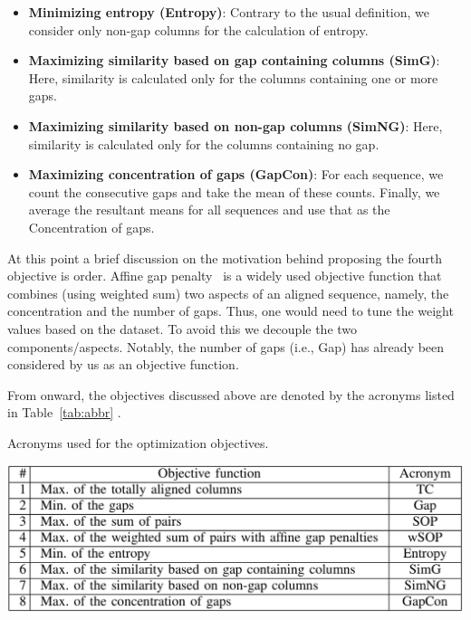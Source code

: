 \begin{itemize}
	\item \textbf{Minimizing entropy (Entropy)}: Contrary to the usual definition, we consider only non-gap columns for the calculation of entropy.
	
	\item \textbf{Maximizing similarity based on gap containing columns (SimG)}: Here, similarity is calculated only for the columns containing one or more gaps. 
	
	\item \textbf{Maximizing similarity based on non-gap columns (SimNG)}: Here, similarity is calculated only for the columns containing no gap.	
	\item \textbf{Maximizing concentration of gaps (GapCon)}: For each sequence, we count the consecutive gaps and take the mean of these counts. Finally, we average the resultant means for all sequences and use that as the Concentration of gaps.
	
\end{itemize}
At this point a brief discussion on the motivation behind proposing the fourth objective is order. Affine gap penalty~\citep{rani2016multiple} is a widely used objective function that combines (using weighted sum) two aspects of an aligned sequence, namely, the concentration and the number of gaps. Thus, one would need to tune the weight values based on the dataset. To avoid this we decouple the two components/aspects. Notably, the number of gaps (i.e., Gap) has already been considered by us as an objective function. 


From onward, the objectives discussed above are denoted by the acronyms listed in Table~\ref{tab:abbr} . 
\begin{table}[!htbp]
	\centering
\caption{Acronyms used for the optimization objectives.}
\includegraphics[width=0.8\columnwidth]{Figure/objective_acronym}
	\label{tab:abbr}
\end{table}

